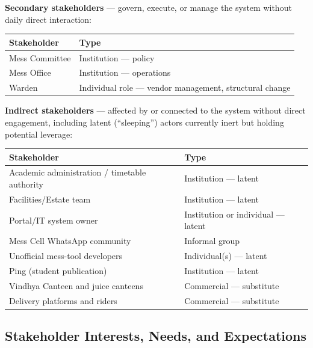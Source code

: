 \documentclass[11pt]{article}
\begin{document}
\textbf{Secondary stakeholders} --- govern, execute, or manage the system without
daily direct interaction:

\begin{longtable}{L{0.55\textwidth}L{0.35\textwidth}}
\toprule
\textbf{Stakeholder} & \textbf{Type} \\
\midrule
\endhead
Mess Committee & Institution --- policy \\
Mess Office & Institution --- operations \\
Warden & Individual role --- vendor management, structural change \\
\bottomrule
\end{longtable}

\textbf{Indirect stakeholders} --- affected by or connected to the system without
direct engagement, including latent (``sleeping'') actors currently inert but
holding potential leverage:

\begin{longtable}{L{0.55\textwidth}L{0.35\textwidth}}
\toprule
\textbf{Stakeholder} & \textbf{Type} \\
\midrule
\endhead
Academic administration / timetable authority & Institution --- latent \\
Facilities/Estate team & Institution --- latent \\
Portal/IT system owner & Institution or individual --- latent \\
Mess Cell WhatsApp community & Informal group \\
Unofficial mess-tool developers & Individual(s) --- latent \\
Ping (student publication) & Institution --- latent \\
Vindhya Canteen and juice canteens & Commercial --- substitute \\
Delivery platforms and riders & Commercial --- substitute \\
\bottomrule
\end{longtable}

\subsection{Stakeholder Interests, Needs, and Expectations}
\end{document}
